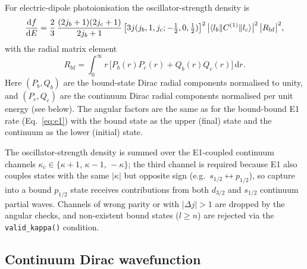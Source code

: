 \documentclass[11pt,a4paper]{article}
\newcommand{\dif}{\mathrm{d}}
\begin{document}
For electric-dipole photoionisation the oscillator-strength density is
\begin{equation}
  \frac{\dif f}{\dif E}
  = \frac{2}{3}\,
    \frac{(2j_{b}+1)(2j_{c}+1)}{2j_{b}+1}\,
    \bigl[3j(j_{b},1,j_{c};-\tfrac12,0,\tfrac12)\bigr]^{2}\,
    \bigl|\braket{l_{b}\|C^{(1)}\|l_{c}}\bigr|^{2}\,
    \bigl|R_{\mathrm{bf}}\bigr|^{2},
  \label{eq:dfdE}
\end{equation}
with the radial matrix element
\begin{equation}
  R_{\mathrm{bf}} = \int_{0}^{\infty}\! r\,
    \bigl[P_{b}(r)P_{c}(r) + Q_{b}(r)Q_{c}(r)\bigr]\,\dif r.
  \label{eq:bfradial}
\end{equation}
Here $(P_{b},Q_{b})$ are the bound-state Dirac radial components
normalised to unity, and $(P_{c},Q_{c})$ are the continuum Dirac radial
components normalised per unit energy (see below).  The angular
factors are the same as for the bound-bound E1 rate
(Eq.~\ref{eq:e1}) with the bound state as the upper (final) state
and the continuum as the lower (initial) state.

The oscillator-strength density is summed over the E1-coupled continuum
channels $\kappa_{c}\in\{\kappa+1,\,\kappa-1,\,-\kappa\}$; the third
channel is required because E1 also couples states with the same
$|\kappa|$ but opposite sign (e.g.\ $s_{1/2}\leftrightarrow p_{1/2}$),
so capture into a bound $p_{1/2}$ state receives contributions from both
$d_{3/2}$ and $s_{1/2}$ continuum partial waves.  Channels of wrong
parity or with $|\Delta j|>1$ are dropped by the angular checks, and
non-existent bound states ($l \ge n$) are rejected via the
{\tt valid\_kappa()} condition.

\subsection{Continuum Dirac wavefunction}
\end{document}
